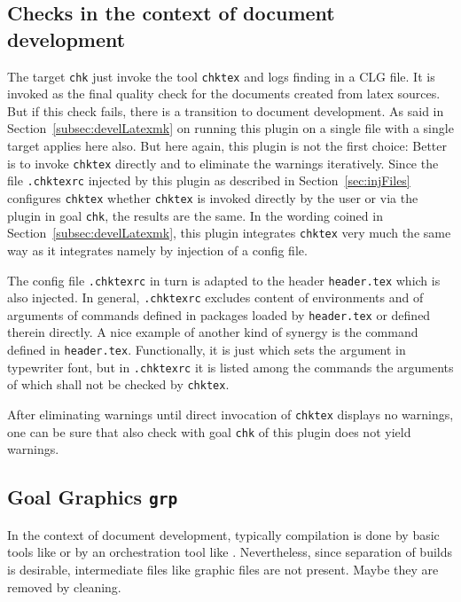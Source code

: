 \subsection{Checks in the context of document development}\label{subsec:develCheck}

The target \texttt{chk} just invoke the tool \texttt{chktex} and logs finding in a CLG file. 
It is invoked as the final quality check for the documents created from latex sources. 
But if this check fails, there is a transition to document development. 
As said in Section~\ref{subsec:develLatexmk} on running this plugin on a single file with a single target 
applies here also. 
But here again, this plugin is not the first choice: Better is to invoke \texttt{chktex} directly 
and to eliminate the warnings iteratively. 
Since the file \texttt{.chktexrc} injected by this plugin as described in Section~\ref{sec:injFiles} 
configures \texttt{chktex} whether \texttt{chktex} is invoked directly by the user 
or via the plugin in goal \texttt{chk}, the results are the same. 
In the wording coined in Section~\ref{subsec:develLatexmk}, 
this plugin integrates \texttt{chktex} very much the same way as it integrates  
namely by injection of a config file. 

The config file \texttt{.chktexrc} in turn is adapted to the header \texttt{header.tex} 
which is also injected. 
In general, \texttt{.chktexrc} excludes content of environments 
and of arguments of commands defined in packages loaded by \texttt{header.tex} 
or defined therein directly. 
A nice example of another kind of synergy is the command  
defined in \texttt{header.tex}. 
Functionally, it is just  which sets the argument in typewriter font, 
but in \texttt{.chktexrc} it is listed among the commands 
the arguments of which shall not be checked by \texttt{chktex}. 
\medskip


After eliminating warnings until direct invocation of \texttt{chktex} displays no warnings, 
one can be sure that also check with goal \texttt{chk} of this plugin does not yield warnings. 


\subsection{Goal Graphics \texttt{grp}}\label{subsec:develGraph}

In the context of document development, 
typically compilation is done by basic tools like \lualatex{} 
or by an orchestration tool like . 
Nevertheless, since separation of builds is desirable, 
intermediate files like graphic files are not present. 
Maybe they are removed by cleaning. 


